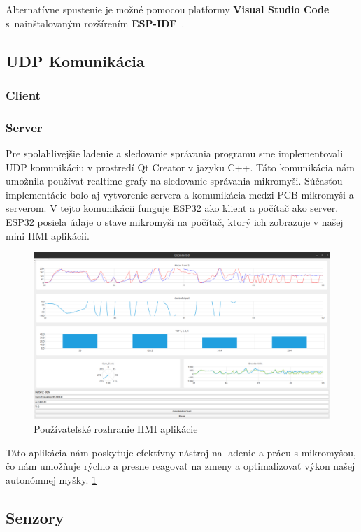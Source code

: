 Alternatívne spustenie je možné pomocou platformy \textbf{Visual Studio Code} s~nainštalovaným rozšírením
\textbf{ESP-IDF}~\cite{espIDF}.
\subsection{UDP Komunikácia}
\subsubsection{Client}


\subsubsection{Server}
Pre spolahlivejšie ladenie a sledovanie správania programu sme implementovali UDP komunikáciu v prostredí Qt Creator v jazyku C++. Táto komunikácia nám umožnila používať realtime grafy na sledovanie správania mikromyši. Súčasťou implementácie bolo aj vytvorenie servera a komunikácia medzi PCB mikromyši a serverom. V tejto komunikácii funguje ESP32 ako klient a počítač ako server. ESP32 posiela údaje o stave mikromyši na počítač, ktorý ich zobrazuje v našej mini HMI aplikácii. 
\begin{figure}[!htpb]
    \centering
    \includegraphics[width=1\linewidth]{includes//images/image.png}
    \caption{Používateľské rozhranie HMI aplikácie }
    \label{fig:UDP}
\end{figure}
Táto aplikácia nám poskytuje efektívny nástroj na ladenie a prácu s mikromyšou, čo nám umožňuje rýchlo a presne reagovať na zmeny a optimalizovať výkon našej autonómnej myšky. \ref{fig:UDP} 
\newpage
\subsection{Senzory}

